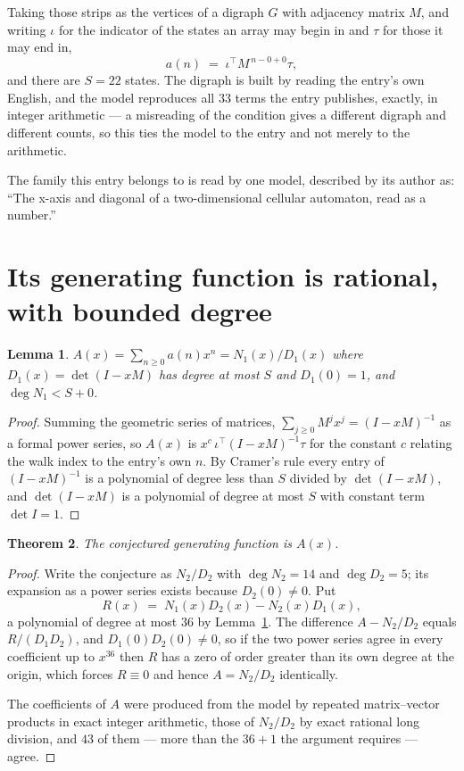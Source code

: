 \documentclass[11pt,a4paper]{article}
\theoremstyle{plain}
\newtheorem{theorem}{Theorem}
\newtheorem{lemma}[theorem]{Lemma}
\theoremstyle{definition}
\begin{document}
Taking those strips as the vertices of a digraph $G$ with adjacency matrix $M$, and writing
$\iota$ for the indicator of the states an array may begin in and $\tau$ for those it may end
in,
\[
a(n)\;=\;\iota^{\!\top}M^{\,n-0+0}\tau ,
\]
and there are $S=22$ states. The digraph is built by reading the entry's own English, and the
model reproduces all $33$ terms the entry publishes, exactly, in integer arithmetic --- a
misreading of the condition gives a different digraph and different counts, so this ties the
model to the entry and not merely to the arithmetic.

The family this entry belongs to is read by one model, described by its author as: ``The x-axis and diagonal of a two-dimensional cellular automaton, read as a number.''


\section{Its generating function is rational, with bounded degree}

\begin{lemma}\label{lem:rat}
$A(x)=\sum_{n\ge0}a(n)x^n=N_1(x)/D_1(x)$ where $D_1(x)=\det(I-xM)$ has degree at most
$S$ and $D_1(0)=1$, and $\deg N_1<S+0$.
\end{lemma}

\begin{proof}
Summing the geometric series of matrices, $\sum_{j\ge0}M^jx^j=(I-xM)^{-1}$ as a formal
power series, so $A(x)$ is $x^{c}\,\iota^{\!\top}(I-xM)^{-1}\tau$ for the constant $c$
relating the walk index to the entry's own $n$. By Cramer's rule every entry of
$(I-xM)^{-1}$ is a polynomial of degree less than $S$ divided by $\det(I-xM)$, and
$\det(I-xM)$ is a polynomial of degree at most $S$ with constant term $\det I=1$.
\end{proof}

\begin{theorem}
The conjectured generating function is $A(x)$.
\end{theorem}

\begin{proof}
Write the conjecture as $N_2/D_2$ with $\deg N_2=14$ and $\deg D_2=5$; its expansion as a
power series exists because $D_2(0)\neq0$. Put
\[
R(x)\;=\;N_1(x)D_2(x)-N_2(x)D_1(x),
\]
a polynomial of degree at most $36$ by Lemma~\ref{lem:rat}. The difference
$A-N_2/D_2$ equals $R/(D_1D_2)$, and $D_1(0)D_2(0)\neq0$, so if the two power series agree in
every coefficient up to $x^{36}$ then $R$ has a zero of order greater than its own
degree at the origin, which forces $R\equiv0$ and hence $A=N_2/D_2$ identically.

The coefficients of $A$ were produced from the model by repeated matrix--vector products in
exact integer arithmetic, those of $N_2/D_2$ by exact rational long division, and $43$
of them --- more than the $36+1$ the argument requires --- agree.
\end{proof}
\end{document}
